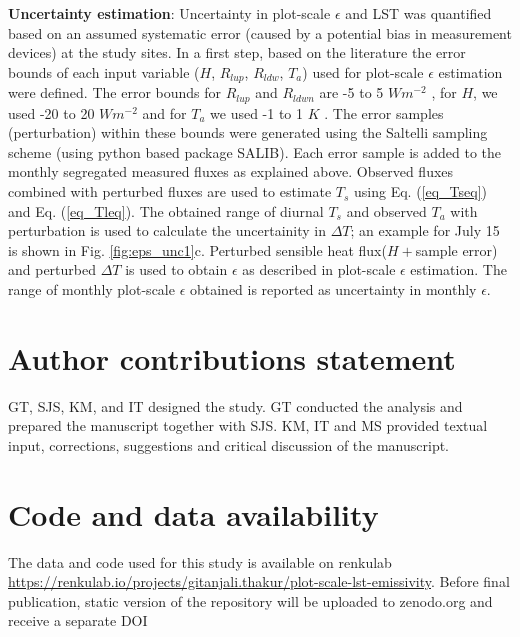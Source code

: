 \documentclass[fleqn,10pt]{wlscirep}
\begin{document}
\textbf{Uncertainty estimation}:
Uncertainty in plot-scale $\epsilon$ and LST was quantified based on an assumed systematic error (caused by a potential bias in measurement devices) at the study sites. In a first step, based on the literature \cite{trenberth2012tracking,foken2008energy} the error bounds of each input variable ($ H$, $R_{lup}$, $R_{ldw}$, $T_{a}$) used for plot-scale $\epsilon$ estimation were defined. The error bounds for $R_{lup}$ and $R_{ldwn}$ are -5 to 5 $Wm^{-2}$ \cite{trenberth2012tracking}, for $H$, we used -20 to 20 $Wm^{-2}$ and for $T_{a}$ we used -1 to 1 $K$ \cite{foken2008energy}. The error samples (perturbation) within these bounds were generated using the Saltelli sampling scheme (using python based package SALIB\cite{saltelli2017new}). Each error sample is added to the monthly segregated measured fluxes as explained above. Observed fluxes combined with perturbed fluxes are used to estimate $T_{s}$ using Eq. (\ref{eq_Tseq}) and  Eq. (\ref{eq_Tleq}). The obtained range of diurnal $T_{s}$ and observed $T_{a}$ with perturbation is used to calculate the uncertainity in $\Delta T$; an example for July 15 is shown in Fig. \ref{fig:eps_unc1}c. Perturbed sensible heat flux($H + $sample error) and perturbed $\Delta T$ is used to obtain $\epsilon$ as described in plot-scale $\epsilon$ estimation. The range of monthly plot-scale $\epsilon$ obtained is reported as uncertainty in monthly $\epsilon$. 
\section{Author contributions statement}
GT, SJS, KM, and IT designed the study. GT conducted the analysis and prepared the manuscript together with SJS. KM, IT and MS provided textual input, corrections, suggestions and critical discussion of the manuscript.
\section{Code and data availability}
The data and code used for this study is available on renkulab \url{https://renkulab.io/projects/gitanjali.thakur/plot-scale-lst-emissivity}. Before final publication, static version of the repository will be uploaded to zenodo.org and receive a separate DOI
\end{document}
